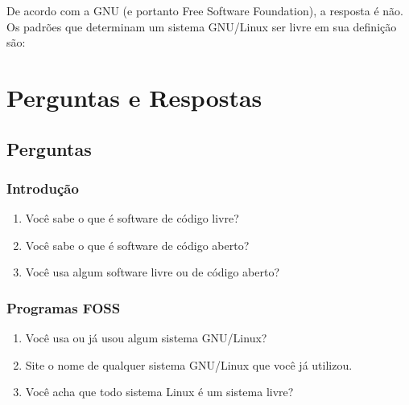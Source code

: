 \documentclass[12pt, a4paper]{report}
\begin{document}
De acordo com a GNU (e portanto Free Software Foundation), a resposta é não. Os padrões que determinam um sistema GNU/Linux ser livre em sua definição são:


\chapter{Perguntas e Respostas}

\section{Perguntas}

\subsection{Introdução}

\begin{enumerate}

  \item Você sabe o que é software de código livre? 

  \item Você sabe o que é software de código aberto? 

  \item Você usa algum software livre ou de código aberto? 

\end{enumerate}

\subsection{Programas FOSS}

\begin{enumerate}

  \item Você usa ou já usou algum sistema GNU/Linux? 

  \item Site o nome de qualquer sistema GNU/Linux que você já utilizou. 

  \item Você acha que todo sistema Linux é um sistema livre? 

\end{enumerate}
\end{document}
